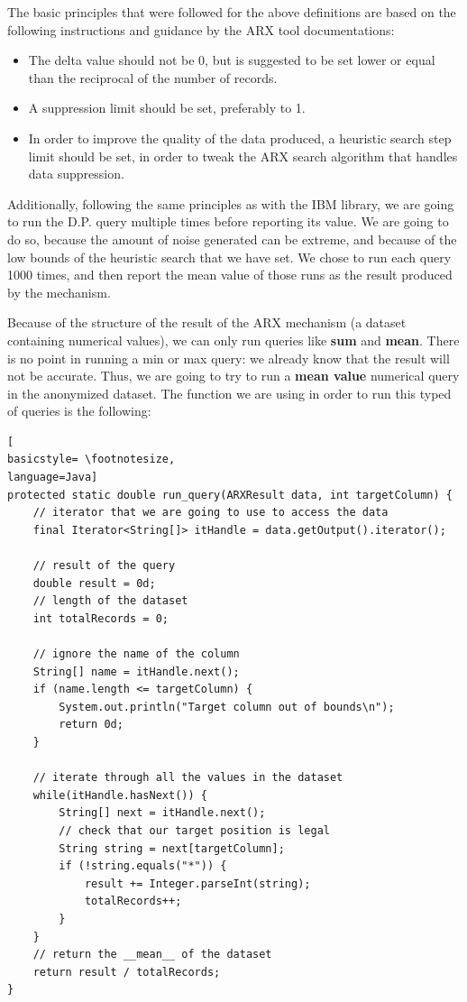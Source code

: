 The basic principles that were followed for the above definitions are based on the following instructions and guidance by the ARX tool documentations:
\begin{itemize}
    \item The delta value should not be 0, but is suggested to be set lower or equal than the reciprocal of the number of records.
    \item A suppression limit should be set, preferably to 1.
    \item In order to improve the quality of the data produced, a heuristic search step limit should be set, in order to tweak the ARX search algorithm that handles data suppression.
\end{itemize}

Additionally, following the same principles as with the IBM library, we are going to run the D.P. query multiple times before reporting its value. We are going to do so, because the amount of noise generated can be extreme, and because of the low bounds of the heuristic search that we have set. We chose to run each query 1000 times, and then report the mean value of those runs as the result produced by the mechanism.

Because of the structure of the result of the ARX mechanism (a dataset containing numerical values), we can only run queries like \textbf{sum} and \textbf{mean}. There is no point in running a min or max query: we already know that the result will not be accurate. Thus, we are going to try to run a\textbf{ mean value} numerical query in the anonymized dataset. The function we are using in order to run this typed of queries is the following:
\bigskip
\clearpage
\begin{lstlisting}[
basicstyle= \footnotesize,
language=Java]
protected static double run_query(ARXResult data, int targetColumn) {
	// iterator that we are going to use to access the data
	final Iterator<String[]> itHandle = data.getOutput().iterator();
	
	// result of the query
	double result = 0d;
	// length of the dataset
	int totalRecords = 0;
	
	// ignore the name of the column
	String[] name = itHandle.next();
	if (name.length <= targetColumn) {
		System.out.println("Target column out of bounds\n");
		return 0d;
	}

	// iterate through all the values in the dataset
	while(itHandle.hasNext()) {
		String[] next = itHandle.next();
		// check that our target position is legal
		String string = next[targetColumn];
		if (!string.equals("*")) {
			result += Integer.parseInt(string);		
			totalRecords++;				
		}
	}
    // return the __mean__ of the dataset
    return result / totalRecords;
}
	
\end{lstlisting}
\bigskip

